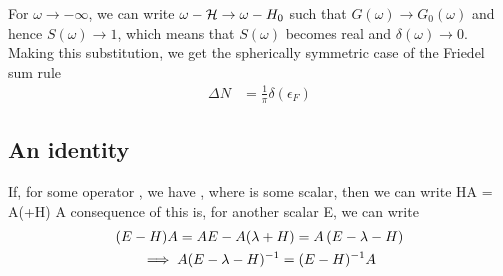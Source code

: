\documentclass[12pt,twoside]{report}
\numberwithin{equation}{section}
\begin{document}
For \(\omega \to -\infty\), we can write \(\omega - \mathcal{H} \to \omega - H_0\) such that \(G(\omega) \to G_0(\omega)\) and hence \(S(\omega) \to 1\), which means that \(S(\omega)\) becomes real and \(\delta(\omega) \to 0\). Making this substitution, we get the spherically symmetric case of the Friedel sum rule
\begin{equation}\begin{aligned}
	\Delta N &= \frac{1}{\pi}\delta(\epsilon_F)
\end{aligned}\end{equation}






\subsection{An identity}
If, for some operator , we have , where \il{\lambda} is some scalar, then we can write
\beq
HA = A(\lambda+H)
\eeq
A consequence of this is, for another scalar E, we can write
\begin{gather}
(E - H)A = AE - A(\lambda+H) = A\left({E -\lambda -H}\right) \\
\implies A(E - \lambda - H)^{-1} = (E-H)^{-1}A\label{identity}
\end{gather}
\end{document}
